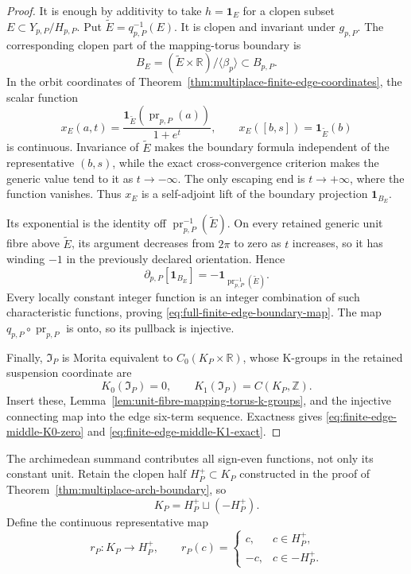 \begin{proof}
It is enough by additivity to take
\(h=\mathbf1_E\) for a clopen subset
\(E\subset Y_{p,P}/H_{p,P}\).  Put
\(\widetilde E=q_{p,P}^{-1}(E)\).  It is clopen and invariant under
\(g_{p,P}\).  The corresponding clopen part of the mapping-torus boundary is
\[
 B_E=(\widetilde E\times\mathbb R)/\langle\beta_p\rangle
 \subset B_{p,P}.
\]
In the orbit coordinates of
Theorem~\ref{thm:multiplace-finite-edge-coordinates}, the scalar function
\begin{equation}
 x_E(a,t)=
 \frac{\mathbf1_{\widetilde E}(\operatorname{pr}_{p,P}(a))}{1+e^t},
 \qquad
 x_E([b,s])=\mathbf1_{\widetilde E}(b)
 \label{eq:finite-edge-explicit-lift}
\end{equation}
is continuous.  Invariance of \(\widetilde E\) makes the boundary formula
independent of the representative \((b,s)\), while the exact cross-convergence
criterion makes the generic value tend to it as \(t\to-\infty\).  The only
escaping end is \(t\to+\infty\), where the function vanishes.  Thus \(x_E\)
is a self-adjoint lift of the boundary projection \(\mathbf1_{B_E}\).

Its exponential is the identity off
\(\operatorname{pr}_{p,P}^{-1}(\widetilde E)\).  On every retained generic
unit fibre above \(\widetilde E\), its argument decreases from \(2\pi\) to
zero as \(t\) increases, so it has winding \(-1\) in the previously declared
orientation.  Hence
\[
 \partial_{p,P}[\mathbf1_{B_E}]
 =-\mathbf1_{\operatorname{pr}_{p,P}^{-1}(\widetilde E)}.
\]
Every locally constant integer function is an integer combination of such
characteristic functions, proving
\eqref{eq:full-finite-edge-boundary-map}.  The map
\(q_{p,P}\circ\operatorname{pr}_{p,P}\) is onto, so its pullback is injective.

Finally, \(\mathfrak I_P\) is Morita equivalent to
\(C_0(K_P\times\mathbb R)\), whose K-groups in the retained suspension
coordinate are
\[
 K_0(\mathfrak I_P)=0,
 \qquad K_1(\mathfrak I_P)=C(K_P,\mathbb Z).
\]
Insert these, Lemma~\ref{lem:unit-fibre-mapping-torus-k-groups}, and the
injective connecting map into the edge six-term sequence.  Exactness gives
\eqref{eq:finite-edge-middle-K0-zero} and
\eqref{eq:finite-edge-middle-K1-exact}.
\end{proof}

The archimedean summand contributes all sign-even functions, not only its
constant unit.  Retain the clopen half \(H_P^+\subset K_P\) constructed in
the proof of Theorem~\ref{thm:multiplace-arch-boundary}, so
\begin{equation}
 K_P=H_P^+\sqcup(-H_P^+).
 \label{eq:arch-clopen-half}
\end{equation}
Define the continuous representative map
\begin{equation}
 r_P:K_P\longrightarrow H_P^+,
 \qquad
 r_P(c)=
 \begin{cases}c,&c\in H_P^+,\\-c,&c\in-H_P^+.
 \end{cases}
 \label{eq:arch-representative-map}
\end{equation}


